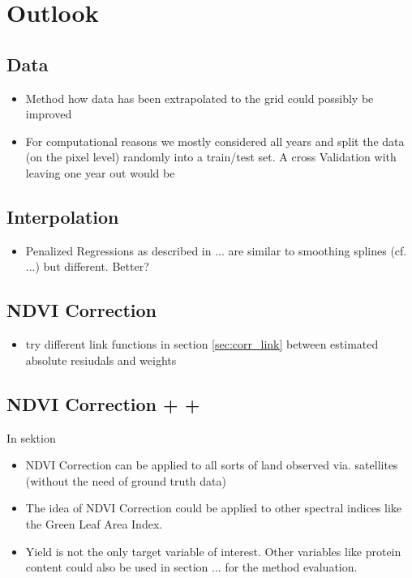 \chapter{Outlook}
\section{Data}
\begin{itemize}
    \item Method how data has been extrapolated to the grid could possibly be improved
    \item For computational reasons we mostly considered all years and split the data (on the pixel level) randomly into a train/test set. A cross Validation with leaving one year out would be 
\end{itemize}    

\section{Interpolation}
\begin{itemize}
    \item Penalized Regressions as described in ... are similar to smoothing splines (cf. ...) but different. Better?
\end{itemize}    

\section{NDVI Correction}
\begin{itemize}
    \item try different link functions in section \ref{sec:corr_link} between estimated absolute resiudals and weights
\end{itemize}    


\section{NDVI Correction + +}
In sektion
\begin{itemize}
    \item NDVI Correction can be applied to all sorts of land observed via. satellites (without the need of ground truth data)
    \item The idea of NDVI Correction could be applied to other spectral indices like the Green Leaf Area Index.
    \item Yield is not the only target variable of interest. Other variables like protein content could also be used in section ... for the method evaluation. 
\end{itemize}    
